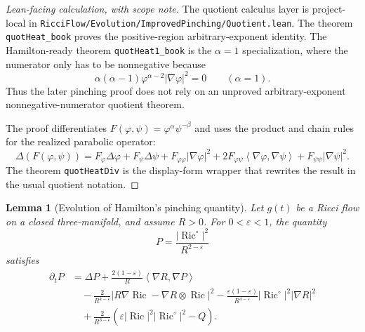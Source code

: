 \documentclass[11pt]{article}
\theoremstyle{plain}
\newtheorem{lemma}[theorem]{Lemma}
\theoremstyle{definition}
\theoremstyle{remark}
\newcommand{\Ric}{\operatorname{Ric}}
\newcommand{\ip}[2]{\left\langle #1,#2\right\rangle}
\newcommand{\norm}[1]{\left|#1\right|}
\newcommand{\eps}{\varepsilon}
\newcommand{\leanref}[1]{\nolinkurl{#1}}
\newcommand{\leanfile}[1]{\nolinkurl{#1}}
\newcommand{\rffile}[1]{\leanfile{#1}}
\begin{document}
\begin{proof}[Lean-facing calculation, with scope note]
The quotient calculus layer is project-local in
\rffile{RicciFlow/Evolution/ImprovedPinching/Quotient.lean}.
The theorem \leanref{quotHeat_book} proves the positive-region
arbitrary-exponent identity.  The Hamilton-ready theorem
\leanref{quotHeat1_book} is the \(\alpha=1\) specialization, where the
numerator only has to be nonnegative because
\[
  \alpha(\alpha-1)\varphi^{\alpha-2}\norm{\nabla\varphi}^2=0
  \qquad (\alpha=1).
\]
Thus the later pinching proof does not rely on an unproved arbitrary-exponent
nonnegative-numerator quotient theorem.

The proof differentiates
\(F(\varphi,\psi)=\varphi^\alpha\psi^{-\beta}\) and uses the product and chain
rules for the realized parabolic operator:
\[
\Delta(F(\varphi,\psi))
=F_\varphi\Delta\varphi+F_\psi\Delta\psi
+F_{\varphi\varphi}\norm{\nabla\varphi}^2
+2F_{\varphi\psi}\ip{\nabla\varphi}{\nabla\psi}
+F_{\psi\psi}\norm{\nabla\psi}^2.
\]
The theorem \leanref{quotHeatDiv} is the display-form wrapper that rewrites the
result in the usual quotient notation.
\end{proof}

\begin{lemma}[Evolution of Hamilton's pinching quantity]
\label{lem:evol-pinching-P}
Let $g(t)$ be a Ricci flow on a closed three-manifold, and assume $R>0$. For
$0<\eps<1$, the quantity
\[
P=\frac{\norm{\Ric^\circ}^2}{R^{2-\eps}}
\]
satisfies
\begin{align}
\partial_tP
&=
\Delta P
+
\frac{2(1-\eps)}{R}\ip{\nabla R}{\nabla P}
\nonumber\\
&\quad
-
\frac{2}{R^{4-\eps}}
\norm{R\nabla\Ric-\nabla R\otimes\Ric}^2
-
\frac{\eps(1-\eps)}{R^{4-\eps}}
\norm{\Ric^\circ}^2\norm{\nabla R}^2
\nonumber\\
&\quad
+
\frac{2}{R^{3-\eps}}
\left(
\eps\norm{\Ric}^2\norm{\Ric^\circ}^2-Q
\right).
\label{eq:evol-pinching-P}
\end{align}
\end{lemma}
\end{document}
